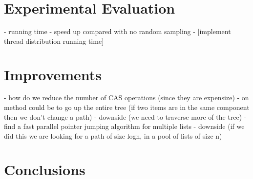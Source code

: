 \documentclass[]{article}
\begin{document}
 \section{Experimental Evaluation}
 - running time
 - speed up compared with no random sampling
 - [implement thread distribution running time]
 
 \section{Improvements}
 - how do we reduce the number of CAS operations (since they are expensize)
  - on method could be to go up the entire tree (if two items are in the same component then we don't change a path)
  - downside (we need to traverse more of the tree)
  - find a fast parallel pointer jumping algorithm for multiple lists
  - downside (if we did this we are looking for a path of size logn, in a pool of lists of size n)
 
 \section{Conclusions}
\end{document}
